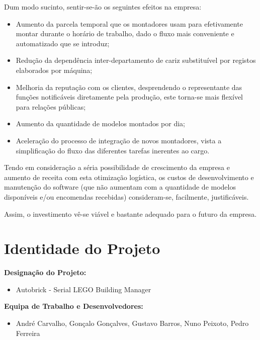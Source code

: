         
        Dum modo sucinto, sentir-se-ão os seguintes efeitos na empresa:
        \begin{itemize}
            \item Aumento da parcela temporal que os montadores usam para efetivamente montar durante o horário de trabalho, dado o fluxo mais conveniente e automatizado que se introduz;
            
            \item Redução da dependência inter-departamento de cariz substituível por registos elaborados por máquina;
            
            \item Melhoria da reputação com os clientes, desprendendo o representante das funções notificáveis diretamente pela produção, este torna-se mais flexível para relações públicas;
            
            \item Aumento da quantidade de modelos montados por dia;
            
            \item Aceleração do processo de integração de novos montadores, vista a simplificação do fluxo das diferentes tarefas inerentes ao cargo.
        \end{itemize}
        
        Tendo em consideração a séria possibilidade de crescimento da empresa e aumento de receita com esta otimização logística, os custos de desenvolvimento e manutenção do software (que não aumentam com a quantidade de modelos disponíveis e/ou encomendas recebidas) consideram-se, facilmente, justificáveis.
        
        Assim, o investimento vê-se viável e bastante adequado para o futuro da empresa.

    \newpage       
    \section{Identidade do Projeto}
        
        \textbf{Designação do Projeto:}
        \begin{itemize}
            \item[] Autobrick - Serial LEGO Building Manager 
        \end{itemize}
         
        \textbf{Equipa de Trabalho e Desenvolvedores:}
        \begin{itemize}
            \item[] André Carvalho, Gonçalo Gonçalves, Gustavo Barros, Nuno Peixoto, Pedro Ferreira
        \end{itemize}
    
